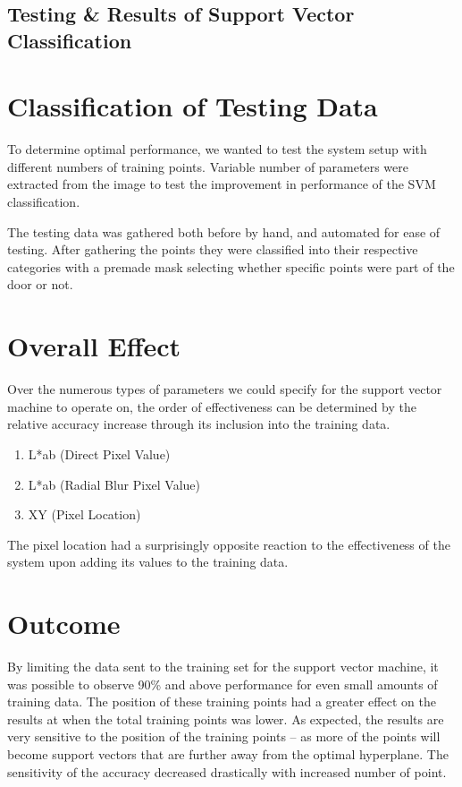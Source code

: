 \section {Testing \& Results of Support Vector Classification}

\chapter{Classification of Testing Data}
To determine optimal performance, we wanted to test the system setup with different numbers of training points. Variable number of parameters were extracted from the image to test the improvement in performance of the SVM classification.

The testing data was gathered both before by hand, and automated for ease of testing. After gathering the points they were classified into their respective categories with a premade mask selecting whether specific points were part of the door or not.

\chapter{Overall Effect}

Over the numerous types of parameters we could specify for the support vector machine to operate on, the order of effectiveness can be determined by the relative accuracy increase through its inclusion into the training data.

\begin{enumerate}
  \item L*ab (Direct Pixel Value)
  \item L*ab (Radial Blur Pixel Value)
  \item XY (Pixel Location)
\end{enumerate}

The pixel location had a surprisingly opposite reaction to the effectiveness of the system upon adding its values to the training data.

\chapter{Outcome}

By limiting the data sent to the training set for the support vector machine, it was possible to observe 90\% and above performance for even small amounts of training data. The position of these training points had a greater effect on the results at when the total training points was lower. As expected, the results are very sensitive to the position of the training points -- as more of the points will become support vectors that are further away from the optimal hyperplane. The sensitivity of the accuracy decreased drastically with increased number of point.


